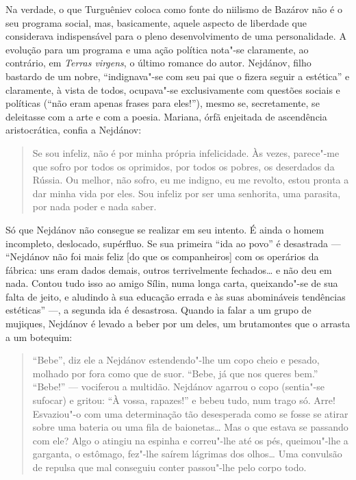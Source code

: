 Na verdade, o que Turguêniev coloca como fonte do niilismo de
Bazárov não é o seu programa social, mas, basicamente, aquele aspecto
de liberdade que considerava indispensável para o pleno desenvolvimento
de uma personalidade. A evolução para um programa e uma ação política
nota"-se claramente, ao contrário, em \emph{Terras virgens}, o último
romance do autor. Nejdánov, filho bastardo de um nobre, ``indignava"-se
com seu pai que o fizera seguir a estética'' e claramente, à vista de
todos, ocupava"-se exclusivamente com questões sociais e políticas (``não
eram apenas frases para eles!''), mesmo se, secretamente, se deleitasse
com a arte e com a poesia. Mariana, órfã enjeitada de ascendência
aristocrática, confia a Nejdánov:

\begin{quotation}
Se sou infeliz, não é por minha própria infelicidade. Às vezes, parece"-me que sofro por todos os oprimidos, por todos os pobres, os deserdados da Rússia. Ou melhor, não sofro, eu me indigno, eu me revolto, estou pronta a dar minha vida por eles. Sou infeliz por ser uma senhorita, uma parasita, por nada poder e nada saber.
\end{quotation}

Só que Nejdánov não consegue se realizar em seu intento. É ainda o homem incompleto, deslocado, supérfluo. Se sua primeira ``ida ao povo'' é desastrada --- ``Nejdánov não foi mais feliz [do que os companheiros] com os operários da fábrica: uns eram dados demais, outros terrivelmente fechados\ldots{} e não deu em nada. Contou tudo isso ao amigo Sílin, numa longa carta, queixando"-se de sua falta de jeito, e aludindo à sua educação errada e às suas abomináveis tendências estéticas'' ---, a segunda ida é desastrosa. Quando ia falar a um grupo de mujiques, Nejdánov é levado a beber por um deles, um brutamontes que o arrasta a um botequim:

\begin{quotation}
``Bebe'', diz ele a Nejdánov estendendo"-lhe um copo cheio e pesado, molhado por fora como que de suor. ``Bebe, já que nos queres bem.'' ``Bebe!'' --- vociferou a multidão. Nejdánov agarrou o copo (sentia"-se sufocar) e gritou: ``À vossa, rapazes!'' e bebeu tudo, num trago só. Arre! Esvaziou"-o com uma determinação tão desesperada como se fosse se atirar sobre uma bateria ou uma fila de baionetas\ldots{} Mas o que estava se passando com ele? Algo o atingiu na espinha e correu"-lhe até os pés, queimou"-lhe a
garganta, o estômago, fez"-lhe saírem lágrimas dos olhos\ldots{} Uma convulsão de repulsa que mal conseguiu conter passou"-lhe pelo corpo todo.
\end{quotation}

